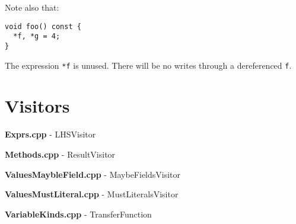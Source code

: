 Note also that:

\begin{verbatim}
void foo() const {
  *f, *g = 4;
}
\end{verbatim}

The expression \verb`*f` is unused.
There will be no writes through a dereferenced \verb`f`.

\section{Visitors}

\textbf{\ttfamily Exprs.cpp} - LHSVisitor

\textbf{\ttfamily Methods.cpp} - ResultVisitor

\textbf{\ttfamily ValuesMaybleField.cpp} -  MaybeFieldsVisitor

\textbf{\ttfamily ValuesMustLiteral.cpp} - MustLiteralsVisitor

\textbf{\ttfamily VariableKinds.cpp} - TransferFunction

